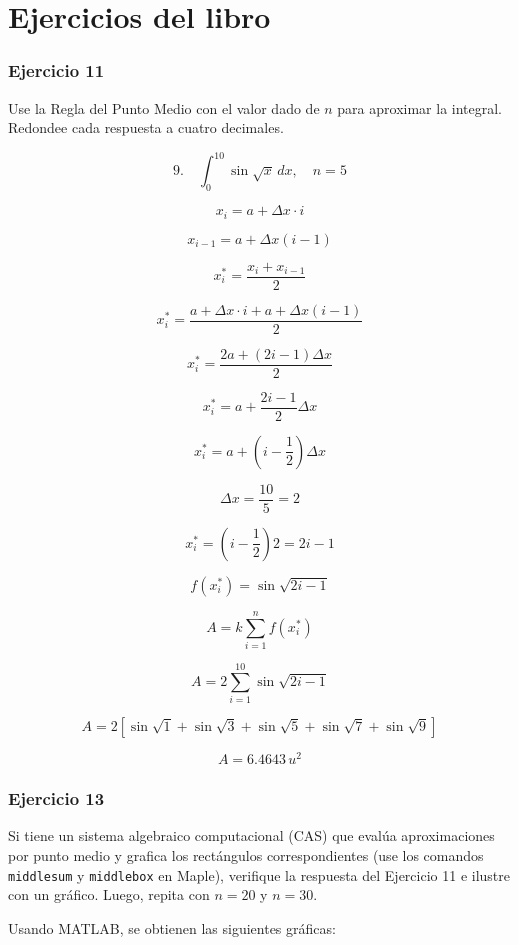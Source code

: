 \section{Ejercicios del libro}

\subsubsection*{Ejercicio 11}

Use la Regla del Punto Medio con el valor dado de \( n \) para aproximar la integral. Redondee cada respuesta a cuatro decimales.


\[
9. \quad \int_{0}^{10} \sin \sqrt{x} \,dx, \quad n = 5
\]

\[
x_i = a + \Delta x \cdot i
\]

\[
x_{i-1} = a + \Delta x (i-1)
\]

\[
x_i^* = \frac{x_i + x_{i-1}}{2}
\]

\[
x_i^* = \frac{a + \Delta x \cdot i + a + \Delta x (i-1)}{2}
\]


\[
x_i^* = \frac{2a + (2i-1) \Delta x}{2}
\]

\[
x_i^* = a + \frac{2i -1}{2} \Delta x
\]

\[
x_i^* = a + \left(i - \frac{1}{2} \right) \Delta x
\]

\[
\Delta x = \frac{10}{5} = 2
\]

\[
x_i^* = \left(i - \frac{1}{2} \right) 2 = 2i -1
\]

\[
f(x_i^*) = \sin \sqrt{2i -1}
\]

\[
A = k \sum_{i=1}^{n} f(x_i^*)
\]

\[
A = 2 \sum_{i=1}^{10} \sin \sqrt{2i -1}
\]


\[
A = 2 \left[ \sin \sqrt{1} + \sin \sqrt{3} + \sin \sqrt{5} + \sin \sqrt{7} + \sin \sqrt{9} \right]
\]

\[
A = 6.4643 \, u^2
\]


\subsubsection*{Ejercicio 13}

Si tiene un sistema algebraico computacional (CAS) que evalúa aproximaciones por punto medio y grafica los rectángulos correspondientes (use los comandos \texttt{middlesum} y \texttt{middlebox} en Maple), verifique la respuesta del Ejercicio 11 e ilustre con un gráfico. Luego, repita con \( n = 20 \) y \( n = 30 \).

Usando MATLAB, se obtienen las siguientes gráficas:

